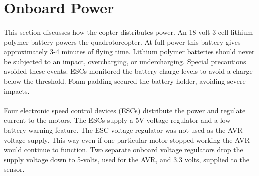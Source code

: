 \section{Onboard Power} 
\paragraph{}
This section discusses how the copter distributes power.  An 18-volt 3-cell lithium polymer battery powers the quadrotorcopter. At full power this battery gives approximately 3-4 minutes of flying time. Lithium polymer batteries should never be subjected to an impact, overcharging, or undercharging.  Special precautions avoided these events.  ESCs monitored the battery charge levels to avoid a charge below the threshold. Foam padding secured the battery holder, avoiding severe impacts.    %
\paragraph{}
Four electronic speed control devices (ESCs) distribute the power and regulate current to the motors. The ESCs supply a 5V voltage regulator and a low battery-warning feature. The ESC voltage regulator was not used as the AVR voltage supply.   This way even if one particular motor stopped working the AVR would continue to function.  Two separate onboard voltage regulators drop the supply voltage down to 5-volts, used for the AVR, and 3.3 volts, supplied to the sensor. 


